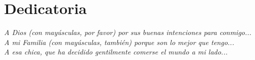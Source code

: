 \chapter*{Dedicatoria}

{\it A Dios (con mayúsculas, por favor) por sus buenas intenciones para conmigo...} \\[2mm]
{\it A mi Familia (con mayúsculas, también) porque son lo mejor que tengo...} \\[2mm]
{\it A esa chica, que ha decidido gentilmente comerse el mundo a mi lado...} \\[2mm]